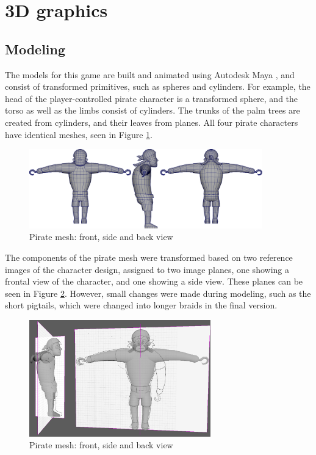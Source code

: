 \section{3D graphics}

\subsection{Modeling}
The models for this game are built and animated using Autodesk Maya \cite{Autodesk}, and consist of transformed primitives, such as spheres and cylinders. For example, the head of the player-controlled pirate character is a transformed sphere, and the torso as well as the limbs consist of cylinders. The trunks of the palm trees are created from cylinders, and their leaves from planes. All four pirate characters have identical meshes, seen in Figure \ref{fig:pirate_mesh}.

\begin{figure}[h!]
	\centering
	\includegraphics[width=0.9\textwidth]{figures/pirate_mesh.png}
	\caption{Pirate mesh: front, side and back view \label{fig:pirate_mesh}}
\end{figure}

The components of the pirate mesh were transformed based on two reference images of the character design, assigned to two image planes, one showing a frontal view of the character, and one showing a side view. These planes can be seen in Figure \ref{fig:pirate_planes}. However, small changes were made during modeling, such as the short pigtails, which were changed into longer braids in the final version.

\begin{figure}[h!]
	\centering
	\includegraphics[width=0.7\textwidth]{figures/pirate_planes.png}
	\caption{Pirate mesh: front, side and back view \label{fig:pirate_planes}}
\end{figure}

